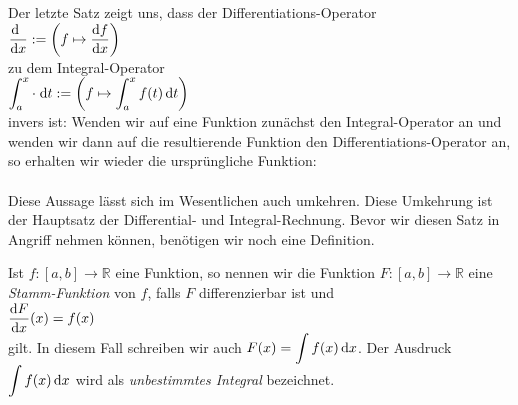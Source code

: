 \remark
Der letzte Satz zeigt uns, dass der Differentiations-Operator
\\[0.2cm]
\hspace*{1.3cm}
$\displaystyle\frac{\textrm{d}\,\;}{\textrm{d}x} := \left(f \mapsto \frac{\textrm{d}f}{\textrm{d}x} \right)$ 
\\[0.2cm]
zu dem Integral-Operator
\\[0.2cm]
\hspace*{1.3cm}
$\displaystyle\int_{a}^x \cdot \;\textrm{d} t := \left(f \mapsto \int_a^x f(t) \, \textrm{d} t\right)$ 
\\[0.2cm]
invers ist: Wenden wir auf eine Funktion zun\"achst den
Integral-Operator an und wenden wir dann auf die resultierende Funktion den
Differentiations-Operator an, so erhalten wir wieder die urspr\"ungliche Funktion:
\\[0.2cm]
\hspace*{1.3cm}
\colorbox{red}{\colorbox{orange}{}}
\\[0.2cm]
Diese Aussage
l\"asst sich im Wesentlichen auch umkehren.  Diese Umkehrung ist der Hauptsatz der Differential- und
Integral-Rechnung.  Bevor wir diesen Satz in Angriff nehmen k\"onnen, ben\"otigen wir noch eine Definition.
\pagebreak

\begin{Definition} \lb
Ist $f:[a,b] \rightarrow \mathbb{R}$ eine Funktion, so nennen wir die Funktion  $F:[a,b]\rightarrow\mathbb{R}$ 
eine \emph{Stamm-Funktion} von $f$, falls $F$ differenzierbar ist und 
\\[0.2cm]
\hspace*{1.3cm} $\displaystyle\frac{\textrm{d}F}{\textrm{d}x}(x) = f(x)$
\\[0.2cm]
gilt.  In diesem Fall schreiben wir auch  $\displaystyle F(x) = \int f(x) \, \textrm{d} x$.
Der Ausdruck $\displaystyle\int f(x) \, \textrm{d} x$ wird als \emph{unbestimmtes Integral} bezeichnet. \eod
\end{Definition}

